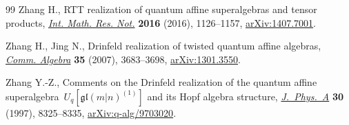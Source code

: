 \documentclass[10pt,a4paper]{amsart}
\numberwithin{equation}{section}
\begin{document}
\begin{thebibliography}{99}
Zhang H., R{TT} realization of quantum affine superalgebras and tensor
 products, \href{https://doi.org/10.1093/imrn/rnv167}{\textit{Int. Math. Res. Not.}} \textbf{2016} (2016), 1126--1157,
 \href{https://arxiv.org/abs/1407.7001}{arXiv:1407.7001}.

Zhang H., Jing N., Drinfeld realization of twisted quantum affine algebras,
 \href{https://doi.org/10.1080/00927870701404713}{\textit{Comm. Algebra}} \textbf{35} (2007), 3683--3698, \href{https://arxiv.org/abs/1301.3550}{arXiv:1301.3550}.

Zhang Y.-Z., Comments on the {D}rinfeld realization of the quantum affine
 superalgebra~{$U_q[\mathfrak{gl}(m|n)^{(1)}]$} and its {H}opf
 algebra structure, \href{https://doi.org/10.1088/0305-4470/30/23/028}{\textit{J.~Phys.~A}} \textbf{30} (1997), 8325--8335,
 \href{https://arxiv.org/abs/q-alg/9703020}{arXiv:q-alg/9703020}.

\end{thebibliography}
\end{document}
